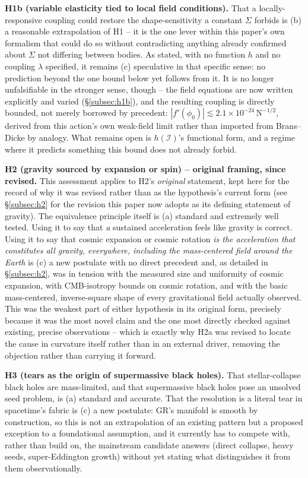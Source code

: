 \documentclass[12pt, a4paper]{article}
\begin{document}
\textbf{H1b (variable elasticity tied to local field conditions).}
That a locally-responsive coupling could restore the shape-sensitivity
a constant $\Sigma$ forbids is (b) a reasonable extrapolation of H1 --
it is the one lever within this paper's own formalism that could do
so without contradicting anything already confirmed about $\Sigma$
not differing between bodies. As stated, with no function $h$ and no
coupling $\lambda$ specified, it remains (c) speculative in that
specific sense: no prediction beyond the one bound below yet follows
from it. It is no longer unfalsifiable in the stronger sense, though
-- the field equations are now written explicitly and varied
(\S\ref{subsec:h1b}), and the resulting coupling is directly bounded,
not merely borrowed by precedent: $|f'(\phi_0)|\lesssim
2.1\times10^{-24}\,\mathrm{N}^{-1/2}$, derived from this action's own
weak-field limit rather than imported from Brans--Dicke by analogy.
What remains open is $h(\mathcal{I})$'s functional form, and a regime
where it predicts something this bound does not already forbid.

\textbf{H2 (gravity sourced by expansion or spin) -- original framing,
since revised.} This assessment applies to H2's \emph{original}
statement, kept here for the record of why it was revised rather than
as the hypothesis's current form (see \S\ref{subsec:h2} for the
revision this paper now adopts as its defining statement of gravity).
The equivalence principle itself is (a) standard and extremely well
tested. Using it to say that \emph{a} sustained acceleration feels
like gravity is correct. Using it to say that cosmic expansion or
cosmic rotation \emph{is the acceleration that constitutes all
gravity, everywhere, including the mass-centered field around the
Earth} is (c) a new postulate with no direct precedent and, as
detailed in \S\ref{subsec:h2}, was in tension with the measured size
and uniformity of cosmic expansion, with CMB-isotropy bounds on
cosmic rotation, and with the basic mass-centered, inverse-square
shape of every gravitational field actually observed. This was the
weakest part of either hypothesis in its original form, precisely
because it was the most novel claim and the one most directly checked
against existing, precise observations -- which is exactly why H2a
was revised to locate the cause in curvature itself rather than in an
external driver, removing the objection rather than carrying it
forward.

\textbf{H3 (tears as the origin of supermassive black holes).} That
stellar-collapse black holes are mass-limited, and that supermassive
black holes pose an unsolved seed problem, is (a) standard and
accurate. That the resolution is a literal tear in spacetime's fabric
is (c) a new postulate: GR's manifold is smooth by construction, so
this is not an extrapolation of an existing pattern but a proposed
exception to a foundational assumption, and it currently has to
compete with, rather than build on, the mainstream candidate answers
(direct collapse, heavy seeds, super-Eddington growth) without yet
stating what distinguishes it from them observationally.
\end{document}
